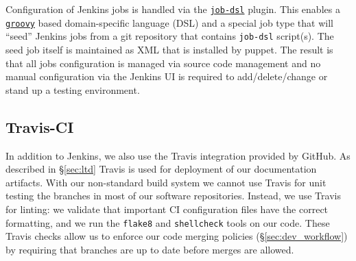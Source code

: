 Configuration of Jenkins jobs is handled via the \href{https://plugins.jenkins.io/job-dsl}{\texttt{job-dsl}} plugin.
This enables a \href{http://www.groovy-lang.org/}{\texttt{groovy}} based domain-specific language (DSL) and a special job type that
will ``seed'' Jenkins jobs from a git repository that contains \texttt{job-dsl}
script(s).  The seed job itself is maintained as XML that is
installed by puppet.  The result is that all jobs configuration is managed via
source code management and no manual configuration via the Jenkins UI is required to
add/delete/change or stand up a testing environment.





\subsection{Travis-CI}
\label{sec:travis-ci}

In addition to Jenkins, we also use the Travis integration provided by GitHub.
As described in \S\ref{sec:ltd} Travis is used for deployment of our documentation artifacts.
With our non-standard build system we cannot use Travis for unit testing the branches in most of our software repositories.
Instead, we use Travis for linting: we validate that important CI configuration files have the correct formatting, and we run the \texttt{flake8} and \texttt{shellcheck} tools on our code.
These Travis checks allow us to enforce our code merging policies (\S\ref{sec:dev_workflow}) by requiring that branches are up to date before merges are allowed.
